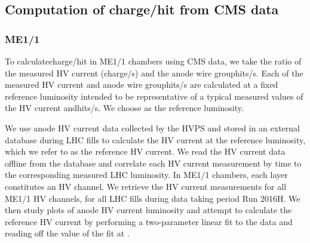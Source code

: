 \subsection{Computation of charge/hit from CMS data}

\subsubsection{ME1/1}
To calculate\unit{charge/hit} in ME1/1 chambers using CMS data, we take the ratio of the measured HV current (\unit{charge/s}) and the anode wire group\unit{hits/s}. Each of the measured HV current and anode wire group\unit{hits/s} are calculated at a fixed reference luminosity intended to be representative of a typical measured values of the HV current and\unit{hits/s}. We choose  as the reference luminosity.

We use anode HV current data collected by the HVPS and stored in an external database during LHC fills to calculate the HV current at the reference luminosity, which we refer to as the reference HV current. We read the HV current data offline from the database and correlate each HV current measurement by time to the corresponding measured LHC luminosity. In ME1/1 chambers, each layer constitutes an HV channel. We retrieve the HV current measurements for all ME1/1 HV channels, for all LHC fills during data taking period Run 2016H. We then study plots of anode HV current \vs luminosity and attempt to calculate the reference HV current by performing a two-parameter linear fit to the data and reading off the value of the fit at . 

